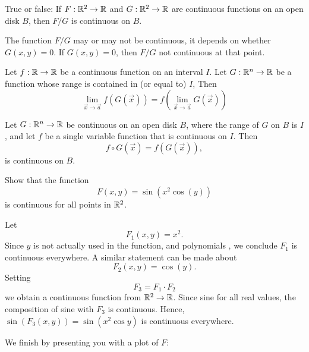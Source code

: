 \documentclass{ximera}
\begin{document}
\begin{question}
  True or false: If $F:\mathbb R^2\to\mathbb R$ and $G:\mathbb R^2\to\mathbb R$ are continuous
  functions on an open disk $B$, then $F/G$ is continuous on $B$.
  \begin{prompt}
    \begin{multipleChoice}
    \end{multipleChoice}
    \begin{feedback}
      The function $F/G$ may or may not be continuous, it depends on
      whether $G(x,y)=0$. If $G(x,y)=0$, then $F/G$ not continuous at that point.
    \end{feedback}
  \end{prompt}
\end{question}


\begin{theorem}
  Let $f:\mathbb R\to\mathbb R$ be a continuous function on an interval $I$. Let
  $G:\mathbb R^n\to \mathbb R$ be a function whose range is contained in (or equal
  to) $I$, Then
  \[
  \lim_{\vec{x}\to\vec{a}} f( G(\vec{x})) = f(\lim_{\vec{x}\to\vec{a}}G(\vec{x}))
  \]
\end{theorem}


\begin{corollary}
  Let $G:\mathbb R^n\to \mathbb R$ be continuous on an open disk $B$, where the
  range of $G$ on $B$ is $I$, and let $f$ be a single variable
  function that is continuous on $I$. Then
  \[
  f\circ G(\vec{x}) =f(G(\vec{x})),
  \]
  is continuous on $B$.
\end{corollary}



\begin{example}
  Show that the function
  \[
  F(x,y) = \sin(x^2\cos(y))
  \]
  is continuous for all points in $\mathbb R^2$.
  \begin{explanation}
    Let
    \[
    F_1(x,y) = x^2.
    \]
    Since $y$ is not actually used in the function, and polynomials
    , we conclude $F_1$ is continuous everywhere. A
    similar statement can be made about
    \[
    F_2(x,y) = \cos(y).
    \]
    Setting
    \[
    F_3=F_1\cdot F_2
    \]
    we obtain a continuous function from $\mathbb R^2\to \mathbb R$. Since sine  for all real values, the composition of sine with $F_3$
    is continuous. Hence, $\sin (F_3(x,y)) = \sin(x^2\cos y)$ is
    continuous everywhere.
    \begin{onlineOnly}
      We finish by presenting you with a plot of $F$:
      \begin{center}
      \end{center}
    \end{onlineOnly}
  \end{explanation}
\end{example}
\end{document}
